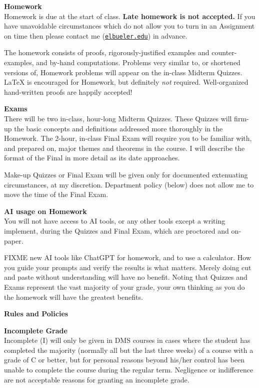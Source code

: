 \documentclass[12pt]{article}
\renewcommand{\emph}[1]{\textsf{\textbf{#1}}}
\newcommand{\localhead}[1]{\par\smallskip\textbf{#1} \smallskip\nobreak\\}%
\def\heading#1{\localhead{\large\emph{#1}}}
\def\subheading#1{\localhead{\emph{#1}}}
\begin{document}
\heading{Homework}
Homework is due at the start of class.  \emph{Late homework is not accepted.}  If you have unavoidable circumstances which do not allow you to turn in an Assignment on time then please contact me (\href{mailto:elbueler@alaska.edu}{\texttt{elbueler\@@alaska.edu}}) in advance.

The homework consists of proofs, rigorously-justified examples and counter-examples, and by-hand computations.  Problems very similar to, or shortened versions of, Homework problems will appear on the in-class Midterm Quizzes.  \LaTeX\xspace is encouraged for Homework, but definitely \textsl{not} required.  Well-organized hand-written proofs are happily accepted!


\heading{Exams}
There will be two in-class, hour-long Midterm Quizzes.  These Quizzes will firm-up the basic concepts and definitions addressed more thoroughly in the Homework.  The 2-hour, in-class Final Exam will require you to be familiar with, and prepared on, major themes and theorems in the course.  I will describe the format of the Final in more detail as its date approaches.

Make-up Quizzes or Final Exam will be given only for documented extenuating circumstances, at my discretion.  Department policy (below) does not allow me to move the time of the Final Exam.


\heading{AI usage on Homework}
You will not have access to AI tools, or any other tools except a writing implement, during the Quizzes and Final Exam, which are proctored and on-paper.

FIXME  new AI tools like ChatGPT for homework, and to use a calculator.  How you guide your prompts and verify the results is what matters.  Merely doing cut and paste without understanding will have no benefit.  Noting that Quizzes and Exams represent the vast majority of your grade, your own thinking as you do the homework will have the greatest benefits.


\phantom{foo}
\heading{Rules and Policies}
\vskip -20pt

\subheading{Incomplete Grade} 
Incomplete (I) will only be given in
  DMS courses in cases where
  the student has completed the majority (normally all but the last
  three weeks) of a course with a grade of C or better, but for
  personal reasons beyond his/her control has been unable to complete
  the course during the regular term. Negligence or indifference are
  not acceptable reasons for granting an incomplete grade.
\end{document}
